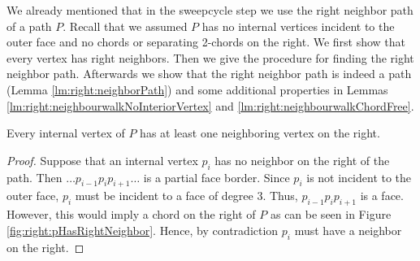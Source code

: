     We already mentioned that in the sweepcycle step we use the right neighbor path of a path $P$. Recall that we assumed $P$ has no internal vertices incident to the outer face and no chords or separating 2-chords on the right.
    We first show that every vertex has right neighbors.
    Then we give the procedure for finding the right neighbor path.
    Afterwards we show that the right neighbor path is indeed a path (Lemma \ref{lm:right:neighborPath}) and some additional properties in Lemmas \ref{lm:right:neighbourwalkNoInteriorVertex} and \ref{lm:right:neighbourwalkChordFree}.

    \begin{lemma}
      \label{lm:right:pHasRightNeihgbours}
      Every internal vertex of $P$ has at least one neighboring vertex on the right.
    \end{lemma}

    \begin{proof}
      Suppose that an internal vertex $p_i$ has no neighbor on the right of the path. Then $ \ldots p_{i-1} p_i p_{i+1} \ldots $ is a partial face border. Since $p_i$ is not incident to the outer face, $p_i$ must be incident to a face of degree $3$. Thus, $p_{i-1} p_i p_{i+1}$ is a face. However, this would imply a chord on the right of $P$ as can be seen in Figure \ref{fig:right:pHasRightNeighbor}. Hence, by contradiction $p_i$ must have a neighbor on the right.
    \end{proof}

